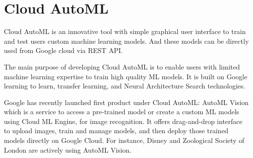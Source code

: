 \section{Cloud AutoML}

Cloud AutoML is an innovative tool with simple graphical user interface to train
and test users custom machine learning models. And these models can be directly
used from Google cloud via REST API.~\cite{hid-sp18-602-cloudautoml-main} 

The main purpose of developing Cloud AutoML is to enable users with limited 
machine learning expertise to train high quality ML models. It is built on Google
learning to learn, transfer learning, and Neural Architecture Search 
technologies.

Google has recently launched first product under Cloud AutoML: AutoML Vision 
which is a service to access a pre-trained model or create a custom ML models using
Cloud ML Engine, for image recognition. It offers drag-and-drop interface to 
upload images, train and manage models, and then deploy those trained models 
directly on Google Cloud. For instance, Disney and Zoological Society of London are
actively using AutoML Vision. ~\cite{hid-sp18-602-cloudautoml-blog} 

